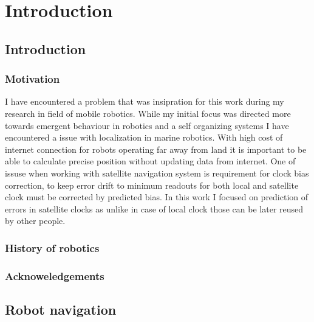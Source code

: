 \chapter{Introduction}


\section{Introduction}

\subsection{Motivation}
I have encountered a problem that was insipration for this work during my research in field
of mobile robotics. While my initial focus was directed more towards emergent behaviour in 
robotics and a self organizing systems I have encountered a issue with localization in marine 
robotics. With high cost of internet connection for robots operating far away from land it 
is important to be able to calculate precise position without updating data from internet.
One of issuse when working with satellite navigation system is requirement for clock bias
correction, to keep error drift to minimum readouts for both local and satellite clock must
be corrected by predicted bias. In this work I focused on prediction of errors in satellite
clocks as unlike in case of local clock those can be later reused by other people.


\subsection{History of robotics}

\subsection{Acknoweledgements}

\section{Robot navigation}

